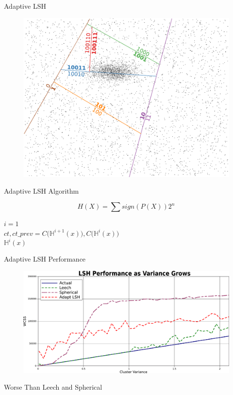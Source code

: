 \documentclass[12pt]{beamer}
\begin{document}
\begin{frame}[plain]{Adaptive LSH}
\begin{figure}
 \centerline{\includegraphics[width=.9\textwidth]{figs/compactcutting}}
\end{figure}
\end{frame}

\begin{frame}[plain]{Adaptive LSH Algorithm}
\begin{Definition}
\label{signbased}
$$
H(X) = \sum sign(P(X))2^n
$$
\end{Definition}

$i=1$\\
$ct,ct\_prev=C\big(\mathbb{H}^{i+1}(x)\big) ,C\big(\mathbb{H}^{i}(x)\big)$\\
 \Return $\mathbb{H}^{i}(x)$

\end{frame}

\begin{frame}[plain]{Adaptive LSH Performance}
 \begin{figure}
 \centerline{\includegraphics[width=.8\textwidth]{figs/clustervarianceVsDecoders}}
\end{figure}
Worse Than Leech and Spherical
\end{frame}
\end{document}
